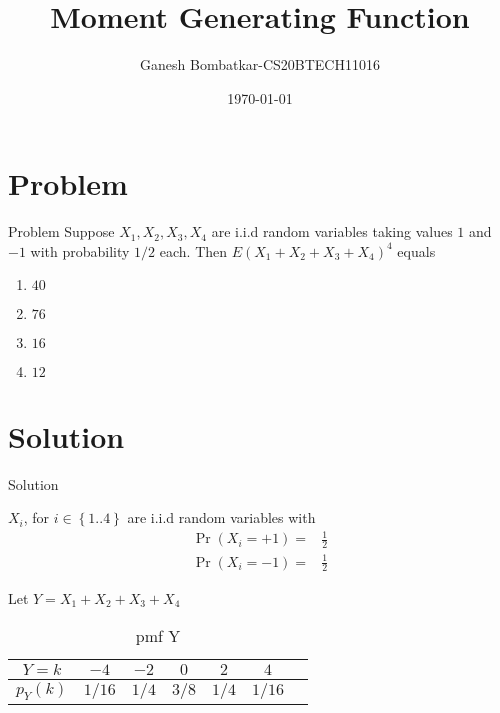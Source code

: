 \documentclass{beamer}
\title{Moment Generating Function}
\author{Ganesh Bombatkar-CS20BTECH11016}
\institute{}
\date{\today}
\providecommand{\pr}[1]{\ensuremath{\Pr\left(#1\right)}}
\providecommand{\brak}[1]{\ensuremath{\left(#1\right)}}
\providecommand{\cbrak}[1]{\ensuremath{\left\{#1\right\}}}
\begin{document}
\begin{frame}
\titlepage
\end{frame}
\section{Problem}
\begin{frame}{}
\begin{block}{Problem}    
Suppose $X_1,X_2,X_3,X_4$ are i.i.d random variables taking values $1$ and $-1$ with probability $1/2$ each. Then $E\brak{X_1+X_2 +X_3 +X_4}^4$ equals
\begin{enumerate}
    \item $40$
    \item $76$
    \item $16$
    \item $12$
\end{enumerate}
\end{block}
\end{frame}

\section{Solution}
\begin{frame}{Solution}
\begin{block}{}
$X_i$, for $i \in \cbrak{1..4}$ are i.i.d random variables with
\begin{align}
    \pr{X_i=+1}=&\frac{1}{2}
    \\\pr{X_i=-1}=&\frac{1}{2}
\end{align}
\end{block}

\begin{block}{}
Let $Y=X_1+X_2 +X_3 +X_4$
\begin{table}[h]
    \centering
    \begin{tabular}{||c||c|c|c|c|c|c||}
         \hline
         \hline
          $Y=k$ &  $-4$ & $-2$ & $0$ & $2$ & $4$ \\
         \hline
          $p_Y(k)$ & ${1}/{16}$ & ${1}/{4}$ & ${3}/{8}$ & ${1}/{4}$ & ${1}/{16}$\\
         \hline
         \hline
    \end{tabular}
    \caption{pmf Y}
    \label{tab:probability_Y}
\end{table}
\end{block}
\end{frame}
\end{document}
